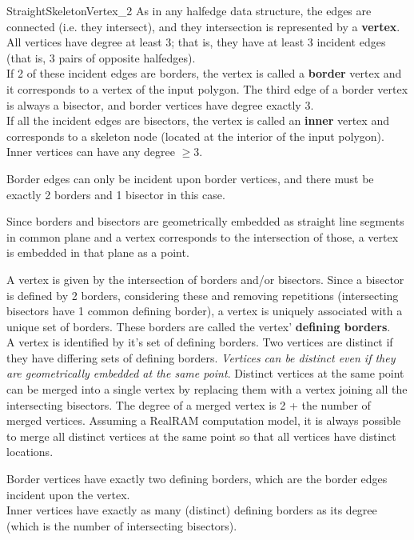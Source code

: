 \begin{ccRefConcept}{StraightSkeletonVertex_2}
As in any halfedge data structure, the edges are connected (i.e. they intersect), and they intersection is represented by a \textbf{vertex}.\\
All vertices have degree at least 3; that is, they have at least 3 incident edges (that is, 3 pairs of opposite halfedges).\\
If 2 of these incident edges are borders, the vertex is called a \textbf{border} vertex and it corresponds to a vertex of the input polygon. The third edge of a border vertex is always a bisector, and border vertices have degree exactly 3.\\
If all the incident edges are bisectors, the vertex is called an \textbf{inner} vertex and corresponds to a skeleton node (located at the interior of the input polygon). Inner vertices can have any degree $\geq 3$.

Border edges can only be incident upon border vertices, and there must be exactly 2 borders and 1 bisector in this case.

Since borders and bisectors are geometrically embedded as straight line segments in common plane and a vertex corresponds to the intersection of those, a vertex is embedded in that plane as a point.

A vertex is given by the intersection of borders and/or bisectors. Since a bisector is defined by 2 borders, considering these and removing repetitions (intersecting bisectors have 1 common defining border), a vertex is uniquely associated with a unique set of borders. These borders are called the vertex' \textbf{defining borders}.\\
A vertex is identified by it's set of defining borders. Two vertices are distinct if they have differing sets of defining borders. \textit{Vertices can be distinct even if they are geometrically embedded at the same point}. Distinct vertices at the same point can be merged into a single vertex by replacing them with a vertex joining all the intersecting bisectors. The degree of a merged vertex is 2 + the number of merged vertices. Assuming a RealRAM computation model, it is always possible to merge all distinct vertices at the same point so that all vertices have distinct locations.

Border vertices have exactly two defining borders, which are the border edges incident upon the vertex.\\
Inner vertices have exactly as many (distinct) defining borders as its degree (which is the number of intersecting bisectors).


\end{ccRefConcept}
